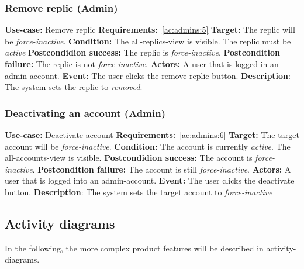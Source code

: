 \subsubsection{Remove replic (Admin)}\label{subsubsec:remove-replic}
\textbf{Use-case:} Remove replic \newline
\textbf{Requirements:}~\ref{ac:admins:5} \newline
\textbf{Target:} The replic will be \textit{force-inactive}. \newline
\textbf{Condition:} The all-replics-view is visible.
The replic must be \textit{active} \newline
\textbf{Postcondidion success:} The replic is \textit{force-inactive}. \newline
\textbf{Postcondition failure:} The replic is not \textit{force-inactive}. \newline
\textbf{Actors:} A user that is logged in an admin-account. \newline
\textbf{Event:} The user clicks the remove-replic button. \newline
\textbf{Description}: The system sets the replic to \textit{removed}.


\subsubsection{Deactivating an account (Admin)}\label{subsubsec:deactivate-acc-admin}
\textbf{Use-case:} Deactivate account \newline
\textbf{Requirements:}~\ref{ac:admins:6} \newline
\textbf{Target:} The target account will be \textit{force-inactive}. \newline
\textbf{Condition:} The account is currently \textit{active}.
The all-accounts-view is visible. \newline
\textbf{Postcondidion success:} The account is \textit{force-inactive}. \newline
\textbf{Postcondition failure:} The account is still \textit{force-inactive}. \newline
\textbf{Actors:} A user that is logged into an admin-account. \newline
\textbf{Event:} The user clicks the deactivate button. \newline
\textbf{Description}: The system sets the target account to \textit{force-inactive}

\subsection{Activity diagrams}\label{subsec:activity-diagrams}
In the following, the more complex product features will be described in activity-diagrams.

